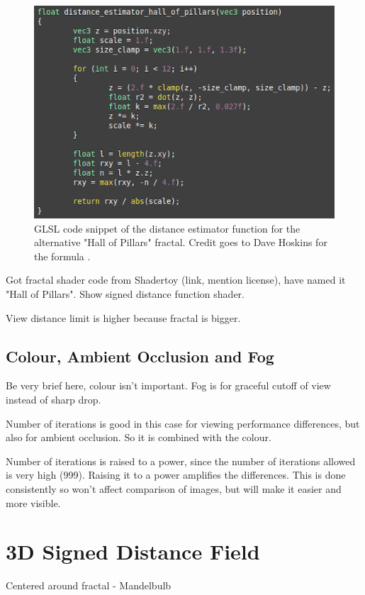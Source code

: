 \begin{figure}[ht]
	\centering
	\includegraphics[width=0.65\linewidth, frame]{Images/GLSL-Distance-Estimator-Hall-Of-Pillars.png}
	\caption{GLSL code snippet of the distance estimator function for the alternative "Hall of Pillars" fractal. Credit goes to Dave Hoskins for the formula \cite{shadertoy-hall-of-pillars}.}
	\label{figure:glsl-distance-estimator-hall-of-pillars}
\end{figure}



Got fractal shader code from Shadertoy (link, mention license), have named it "Hall of Pillars". Show signed distance function shader.

View distance limit is higher because fractal is bigger.

\subsection{Colour, Ambient Occlusion and Fog}

Be very brief here, colour isn't important. Fog is for graceful cutoff of view instead of sharp drop.

Number of iterations is good in this case for viewing performance differences, but also for ambient occlusion. So it is combined with the colour.

Number of iterations is raised to a power, since the number of iterations allowed is very high (999). Raising it to a power amplifies the differences. This is done consistently so won't affect comparison of images, but will make it easier and more visible.

\section{3D Signed Distance Field}

Centered around fractal - Mandelbulb

